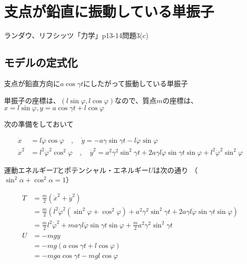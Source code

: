 \chapter{支点が鉛直に振動している単振子}

ランダウ、リフシッツ「力学」p13-14問題3(c)

\section{モデルの定式化}

\begin{comment}
    \begin{figure}[htbp]
        \begin{minipage}[b]{0.45\linewidth}
          \centering
          \texttt{[image: eps/vertical.eps]}
          \caption{支点が鉛直に振動している単振子}
        \end{minipage}
      \end{figure}
\end{comment}

支点が鉛直方向に$a\cos\gamma t$にしたがって振動している単振子

単振子の座標は、$(l\sin\varphi,l\cos\varphi)$なので、質点$m$の座標は、$x= l\sin\varphi, y = a\cos\gamma t + l\cos\varphi$

次の準備をしておいて

\begin{align*}
   \dot{x} &= l\dot{\varphi}\cos\varphi \quad , \quad \dot{y}=-a\gamma\sin\gamma t - l\dot{\varphi}\sin\varphi\\
   \dot{x}^2 &= l^2\dot{\varphi}^2\cos^2\varphi \quad , \quad \dot{y}^2 = a^2\gamma^2\sin^2\gamma t +2a\gamma l \dot{\varphi}\sin\gamma t \sin\varphi + l^2\dot{\varphi}^2\sin^2\varphi
\end{align*}

運動エネルギー$T$とポテンシャル・エネルギー$U$は次の通り
（$\sin^2\alpha+\cos^2\alpha=1$）

\begin{align*}
   T &= \frac{m}{2}\left(\dot{x}^2+\dot{y}^2\right)\\
   &=\frac{m}{2}\left(l^2\dot{\varphi}^2\left(\sin^2\varphi+\cos^2\varphi\right) +a^2\gamma^2\sin^2\gamma t + 2a\gamma l \dot{\varphi}\sin\gamma t\sin\varphi\right)\\
   &=\frac{m}{2}l^2\dot{\varphi}^2 + ma\gamma l\dot{\varphi}\sin\gamma t\sin\varphi + \frac{m}{2}a^2\gamma^2\sin^2\gamma t\\
   U &= -mgy\\&=-mg(a\cos\gamma t +l\cos\varphi)\\&=-mga\cos\gamma t - mgl\cos\varphi
\end{align*}

